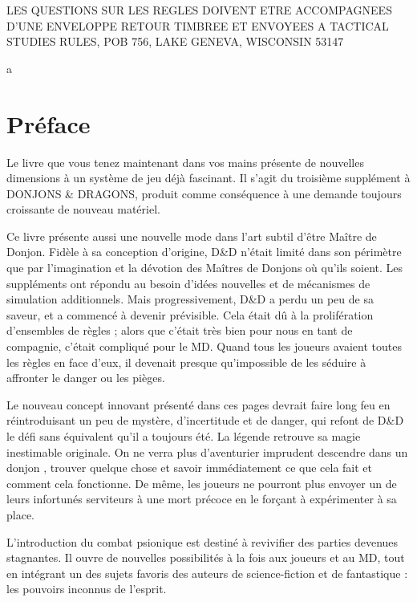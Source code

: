 \documentclass[11pt]{article}
\begin{document}
{\small \noindent LES QUESTIONS SUR LES REGLES DOIVENT ETRE ACCOMPAGNEES D'UNE ENVELOPPE RETOUR TIMBREE ET ENVOYEES A TACTICAL STUDIES RULES, POB 756, LAKE GENEVA, WISCONSIN 53147}


\newpage
{\color{white}a}

\vfill


\newpage

\section*{Préface}

Le livre que vous tenez maintenant dans vos mains présente de nouvelles dimensions à un système de jeu déjà fascinant. Il s'agit du troisième supplément à DONJONS \& DRAGONS, produit comme conséquence à une demande toujours croissante de nouveau matériel.

Ce livre présente aussi une nouvelle mode dans l'art subtil d'être Maître de Donjon. Fidèle à sa conception d'origine, D\&D n'était limité dans son périmètre que par l'imagination et la dévotion des Maîtres de Donjons où qu'ils soient. Les suppléments ont répondu au besoin d'idées nouvelles et de mécanismes de simulation additionnels. Mais progressivement, D\&D a perdu un peu de sa saveur, et a commencé à devenir prévisible. Cela était dû à la prolifération d'ensembles de règles ; alors que c'était très bien pour nous en tant de compagnie, c'était compliqué pour le MD. Quand tous les joueurs avaient toutes les règles en face d'eux, il devenait presque qu'impossible de les séduire à affronter le danger ou les pièges.

Le nouveau concept innovant présenté dans ces pages devrait faire long feu en réintroduisant un peu de mystère, d'incertitude et de danger, qui refont de D\&D le défi sans équivalent qu'il a toujours été. La légende retrouve sa magie inestimable originale. On ne verra plus d'aventurier imprudent descendre dans un donjon , trouver quelque chose et savoir immédiatement ce que cela fait et comment cela fonctionne. De même, les joueurs ne pourront plus envoyer un de leurs infortunés serviteurs à une mort précoce en le forçant à expérimenter à sa place.

L'introduction du combat psionique est destiné à revivifier des parties devenues stagnantes. Il ouvre de nouvelles possibilités à la fois aux joueurs et au MD, tout en intégrant un des sujets favoris des auteurs de science-fiction et de fantastique : les pouvoirs inconnus de l'esprit.
\end{document}
